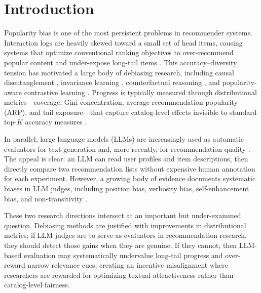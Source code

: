 \documentclass[pdflatex,sn-basic,referee,lineno]{sn-jnl}
\begin{document}
\maketitle

\section{Introduction}
\label{sec:introduction}

Popularity bias is one of the most persistent problems in recommender systems. Interaction logs are heavily skewed toward a small set of head items, causing systems that optimize conventional ranking objectives to over-recommend popular content and under-expose long-tail items \citep{zhou2010solving,chen2023bias}. This accuracy--diversity tension has motivated a large body of debiasing research, including causal disentanglement \citep{zheng2021disentangling}, invariance learning \citep{zhang2023invariant}, counterfactual reasoning \citep{wei2021model}, and popularity-aware contrastive learning \citep{cai2024paac}. Progress is typically measured through distributional metrics---coverage, Gini concentration, average recommendation popularity (ARP), and tail exposure---that capture catalog-level effects invisible to standard top-$K$ accuracy measures \citep{kaminskas2016diversity,ge2010beyond,abdollahpouri2020popularity}.

In parallel, large language models (LLMs) are increasingly used as automatic evaluators for text generation \citep{zheng2023judging,liu2023geval,chiang2023can} and, more recently, for recommendation quality \citep{wu2024survey,dai2023uncovering,recsysarena2024}. The appeal is clear: an LLM can read user profiles and item descriptions, then directly compare two recommendation lists without expensive human annotation for each experiment. However, a growing body of evidence documents systematic biases in LLM judges, including position bias, verbosity bias, self-enhancement bias, and non-transitivity \citep{zheng2023judging,raina2025judging,wang2024large,stureborg2024large,liu2025nontransitivity,koo2024benchmarking}.

These two research directions intersect at an important but under-examined question. Debiasing methods are justified with improvements in distributional metrics; if LLM judges are to serve as evaluators in recommendation research, they should detect those gains when they are genuine. If they cannot, then LLM-based evaluation may systematically undervalue long-tail progress and over-reward narrow relevance cues, creating an incentive misalignment where researchers are rewarded for optimizing textual attractiveness rather than catalog-level fairness.
\end{document}
